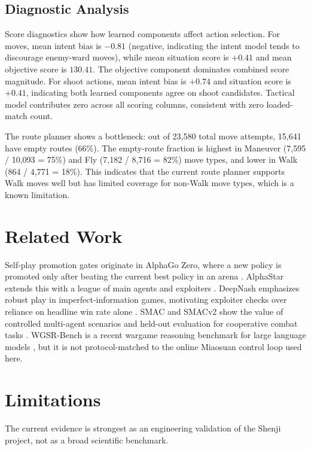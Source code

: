 \documentclass{article}
\begin{document}
\subsection{Diagnostic Analysis}

Score diagnostics show how learned components affect action selection. For moves, mean intent bias is $-0.81$ (negative, indicating the intent model tends to discourage enemy-ward moves), while mean situation score is $+0.41$ and mean objective score is $130.41$. The objective component dominates combined score magnitude. For shoot actions, mean intent bias is $+0.74$ and situation score is $+0.41$, indicating both learned components agree on shoot candidates. Tactical model contributes zero across all scoring columns, consistent with zero loaded-match count.

The route planner shows a bottleneck: out of 23,580 total move attempts, 15,641 have empty routes (66\%). The empty-route fraction is highest in Maneuver (7,595 / 10,093 = 75\%) and Fly (7,182 / 8,716 = 82\%) move types, and lower in Walk (864 / 4,771 = 18\%). This indicates that the current route planner supports Walk moves well but has limited coverage for non-Walk move types, which is a known limitation.

\section{Related Work}

Self-play promotion gates originate in AlphaGo Zero, where a new policy is promoted only after beating the current best policy in an arena \citep{silver2017alphagozero}. AlphaStar extends this with a league of main agents and exploiters \citep{vinyals2019alphastar}. DeepNash emphasizes robust play in imperfect-information games, motivating exploiter checks over reliance on headline win rate alone \citep{perolat2022deepnash}. SMAC and SMACv2 show the value of controlled multi-agent scenarios and held-out evaluation for cooperative combat tasks \citep{samvelyan2019smac,ellis2023smacv2}. WGSR-Bench is a recent wargame reasoning benchmark for large language models \citep{yin2025wgsrbench}, but it is not protocol-matched to the online Miaosuan control loop used here.

\section{Limitations}

The current evidence is strongest as an engineering validation of the Shenji project, not as a broad scientific benchmark.
\end{document}
